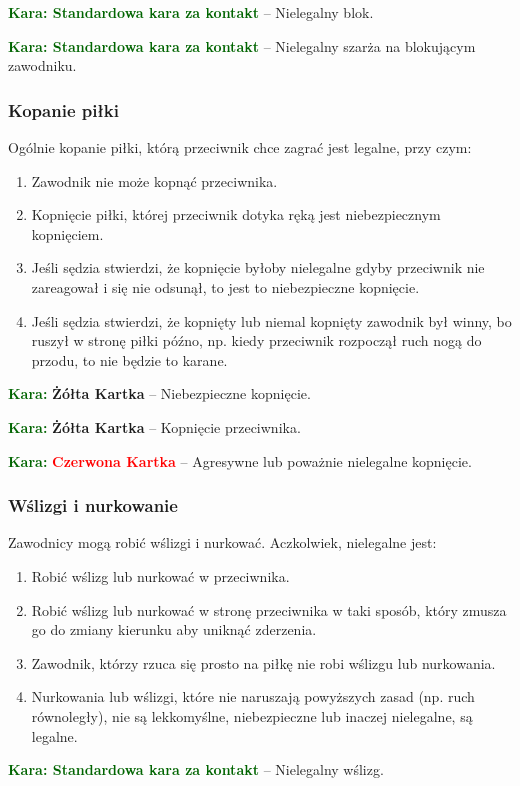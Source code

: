 \documentclass[11pt,a4paper]{article}
\newcommand\redcard[1]{\bgroup\textcolor{darkgreen}{\textbf{Kara: }}\bgroup\textcolor{red}{\textbf{Czerwona Kartka}} -- #1}
\newcommand\yellowcard[1]{\bgroup\textcolor{darkgreen}{\textbf{Kara: }}\bgroup\textcolor{darkyellow}{\textbf{Żółta Kartka}} -- #1}
\newcommand\penaltyd[2]{\bgroup\textcolor{darkgreen}{\textbf{Kara: #1}} -- #2}
\begin{document}
\penaltyd{Standardowa kara za kontakt}{Nielegalny blok.}

\penaltyd{Standardowa kara za kontakt}{Nielegalny szarża na blokującym zawodniku.}

\subsubsection{Kopanie piłki}
Ogólnie kopanie piłki, którą przeciwnik chce zagrać jest legalne, przy czym:
\begin{enumerate}
  \item Zawodnik nie może kopnąć przeciwnika.
  \item Kopnięcie piłki, której przeciwnik dotyka ręką jest niebezpiecznym kopnięciem.
  \item Jeśli sędzia stwierdzi, że kopnięcie byłoby nielegalne gdyby przeciwnik nie zareagował i się nie odsunął, to jest to niebezpieczne kopnięcie.
  \item Jeśli sędzia stwierdzi, że kopnięty lub niemal kopnięty zawodnik był winny, bo ruszył w stronę piłki późno, np. kiedy przeciwnik rozpoczął ruch nogą do przodu, to nie będzie to karane.
\end{enumerate}

\yellowcard{Niebezpieczne kopnięcie.}

\yellowcard{Kopnięcie przeciwnika.}

\redcard{Agresywne lub poważnie nielegalne kopnięcie.}

\subsubsection{Wślizgi i nurkowanie}
Zawodnicy mogą robić wślizgi i nurkować. Aczkolwiek, nielegalne jest:
\begin{enumerate}
  \item Robić wślizg lub nurkować w przeciwnika.
  \item Robić wślizg lub nurkować w stronę przeciwnika w taki sposób, który zmusza go do zmiany kierunku aby uniknąć zderzenia.
  \item Zawodnik, którzy rzuca się prosto na piłkę nie robi wślizgu lub nurkowania.
  \item Nurkowania lub wślizgi, które nie naruszają powyższych zasad (np. ruch równoległy), nie są lekkomyślne, niebezpieczne lub inaczej nielegalne, są legalne.
\end{enumerate}

\penaltyd{Standardowa kara za kontakt}{Nielegalny wślizg.}
\end{document}
